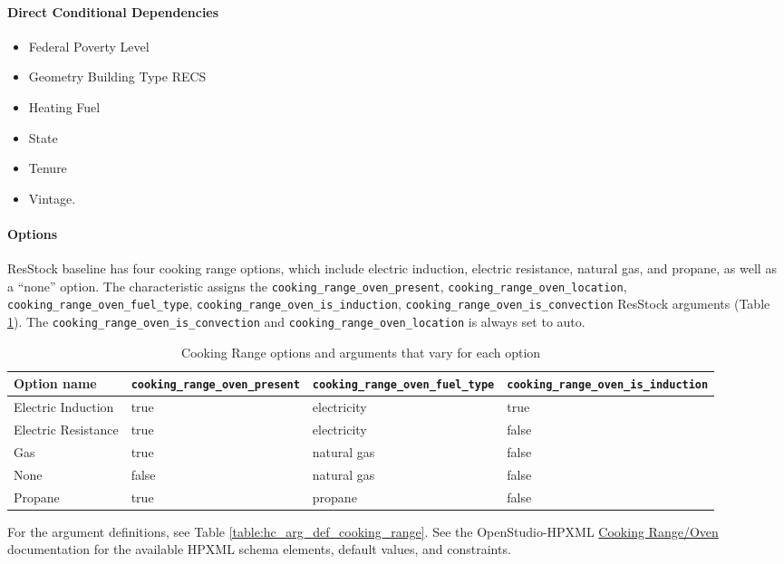 \paragraph{Direct Conditional Dependencies}
\begin{itemize}
    \item Federal Poverty Level
    \item Geometry Building Type RECS
    \item Heating Fuel
    \item State
    \item Tenure
    \item Vintage.
\end{itemize}

\paragraph{Options}
ResStock baseline has four cooking range options, which include electric induction, electric resistance, natural gas, and propane, as well as a ``none'' option. The characteristic assigns the \texttt{cooking\_range\_oven\_present},  \texttt{cooking\_range\_oven\_location}, \texttt{cooking\_range\_oven\_fuel\_type}, \texttt{cooking\_range\_oven\_is\_induction}, 
 \texttt{cooking\_range\_oven\_is\_convection} ResStock arguments (Table \ref{table:hc_opt_cooking}). The \texttt{cooking\_range\_oven\_is\_convection} and \texttt{cooking\_range\_oven\_location} is always set to auto.

\begin{longtable}[]{ |p{3.5cm}|p{3.5cm}|p{3.5cm}|p{3.5cm}| }
\caption{Cooking Range options and arguments that vary for each option} \label{table:hc_opt_cooking} \\
\toprule\noalign{}
Option name & \texttt{cooking\_range\_oven\_present} &
\texttt{cooking\_range\_oven\_fuel\_type} &
\texttt{cooking\_range\_oven\_is\_induction} \\
\midrule\noalign{}
\endhead
\bottomrule\noalign{}
\endlastfoot
Electric Induction  & true & electricity & true \\
Electric Resistance & true & electricity & false \\
Gas & true & natural gas & false \\
None & false & natural gas & false \\
Propane & true & propane & false \\
\end{longtable}
For the argument definitions, see Table \ref{table:hc_arg_def_cooking_range}. See the OpenStudio-HPXML \href{https://openstudio-hpxml.readthedocs.io/en/v1.8.1/workflow_inputs.html#hpxml-cooking-range-oven}{Cooking Range/Oven} documentation for the available HPXML schema elements, default values, and constraints.

